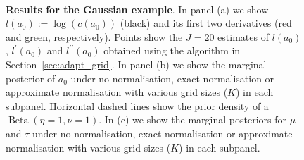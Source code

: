 \documentclass[a4paper, notitlepage, 11pt]{article}
\begin{document}
\begin{figure}[!ht]
\hfill
{}
\hfill
{}\\
\hfill
{}
\hfill
\caption{\textbf{Results for the Gaussian example}.
In panel (a) we show $l(a_0) := \log(c(a_0))$ (black) and its first two derivatives (red and green, respectively).
Points show the $J = 20$ estimates of $l(a_0)$, $l^\prime(a_0)$ and $l^{\prime\prime}(a_0)$ obtained using the algorithm in Section~\ref{sec:adapt_grid}.
In panel (b)  we show the marginal posterior of $a_0$ under no normalisation, exact normalisation or approximate normalisation with various grid sizes ($K$) in each subpanel.
Horizontal dashed lines show the prior density of a $\operatorname{Beta}(\eta = 1, \nu = 1)$.
In (c) we show the marginal posteriors for $\mu$ and $\tau$ under no normalisation, exact normalisation or approximate normalisation with various grid sizes ($K$) in each subpanel.
}
\label{fig:gaussian_results}
\end{figure}
\end{document}
